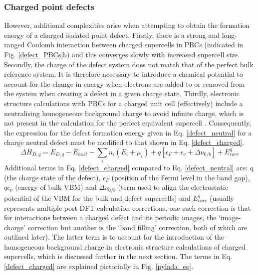\documentclass[11pt, twoside]{report}
\begin{document}
\subsubsection{Charged point defects}
However, additional complexities arise when attempting to obtain the formation energy of a charged isolated point defect. Firstly, there is a strong and long-ranged Coulomb interaction between charged supercells in PBCs (indicated in Fig. \ref{defect_PBCs}b) and this converges slowly with increased supercell size.
Secondly, the charge of the defect system does not match that of the perfect bulk reference system. It is therefore necessary to introduce a chemical potential to account for the change in energy when electrons are added to or removed from the system when creating a defect in a given charge state.
Thirdly, electronic structure calculations with PBCs for a charged unit cell (effectively) include a neutralising homogeneous background charge to avoid infinite charge, which is not present in the calculation for the perfect equivalent supercell \cite{freysoldt_rev}. Consequently, the expression for the defect formation energy given in Eq. \ref{defect_neutral} for a charge neutral defect must be modified to that shown in Eq. \ref{defect_charged}.
\begin{equation}\label{defect_charged}
\Delta H_{D,q} = E_{D,q} - E_{host} - \sum_i n_i (E_i + \mu_i) + q[\epsilon_F + \epsilon_{\nu} + \Delta \nu_{0/b}] + E^q_{corr}
\end{equation}
Additional terms in Eq. \ref{defect_charged} compared to Eq. \ref{defect_neutral} are: q (the charge state of the defect), $\epsilon_F$ (position of the Fermi level in the band gap),  $q \epsilon_{\nu}$ (energy of bulk VBM) and $\Delta \nu_{0/b}$ (term used to align the electrostatic potential of the VBM for the bulk and defect supercells) and $E^q_{corr}$ (usually represents multiple post-DFT calculation corrections, one such correction is that for interactions between a charged defect and its periodic images, the `image-charge' correction but another is the `band filling' correction, both of which are outlined later). The latter term is to account for the introduction of the homogeneous background charge in electronic structure calculations of charged supercells, which is discussed further in the next section. The terms in Eq. \ref{defect_charged} are explained pictorially in Fig. \ref{pylada_eq}.
\end{document}
